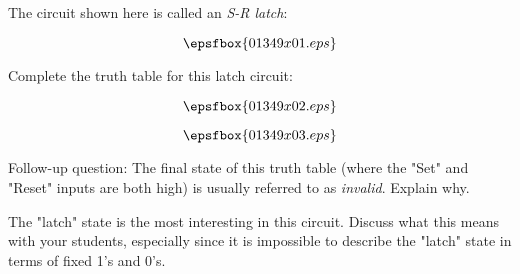 

The circuit shown here is called an {\it S-R latch}:

$$\epsfbox{01349x01.eps}$$

Complete the truth table for this latch circuit:

$$\epsfbox{01349x02.eps}$$







$$\epsfbox{01349x03.eps}$$

\vskip 10pt

Follow-up question: The final state of this truth table (where the "Set" and "Reset" inputs are both high) is usually referred to as {\it invalid}.  Explain why.







The "latch" state is the most interesting in this circuit.  Discuss what this means with your students, especially since it is impossible to describe the "latch" state in terms of fixed 1's and 0's.




